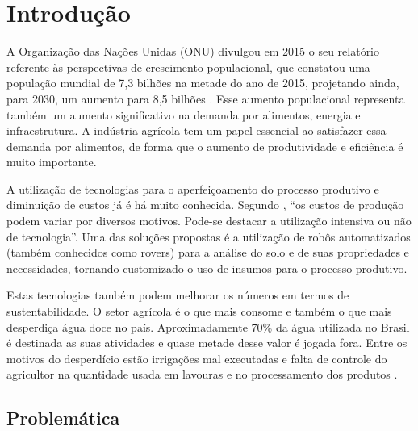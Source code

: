\chapter{Introdução}

  A Organização das Nações Unidas (ONU) divulgou em 2015 o seu relatório referente
  às perspectivas de crescimento populacional, que constatou uma população mundial
  de 7,3 bilhões na metade do ano de 2015, projetando ainda, para 2030, um aumento
  para 8,5 bilhões \cite{ONU2015}. Esse aumento populacional representa também um
  aumento significativo na demanda por alimentos, energia e infraestrutura.
  A indústria agrícola tem um papel essencial ao satisfazer essa demanda por alimentos,
  de forma que o aumento de produtividade e eficiência é muito importante.
 
  A utilização de tecnologias para o aperfeiçoamento do processo produtivo e
  diminuição de custos já é há muito conhecida. Segundo \cite{RAMIZ1988},
  “os custos de produção podem variar por diversos motivos. Pode-se destacar a
  utilização intensiva ou não de tecnologia”. Uma das soluções propostas é a
  utilização de robôs automatizados (também conhecidos como rovers) para a
  análise do solo e de suas propriedades e necessidades, tornando customizado
  o uso de insumos para o processo produtivo.

  Estas tecnologias também podem melhorar os números em termos de sustentabilidade.
  O setor agrícola é o que mais consome e também o que mais desperdiça água doce no país.
  Aproximadamente 70\% da água utilizada no Brasil é destinada as suas atividades
  e quase metade desse valor é jogada fora. Entre os motivos do desperdício estão
  irrigações mal executadas e falta de controle do agricultor na quantidade usada
  em lavouras e no processamento dos produtos \cite{fao2013}.
    
  \section{Problemática}
  
